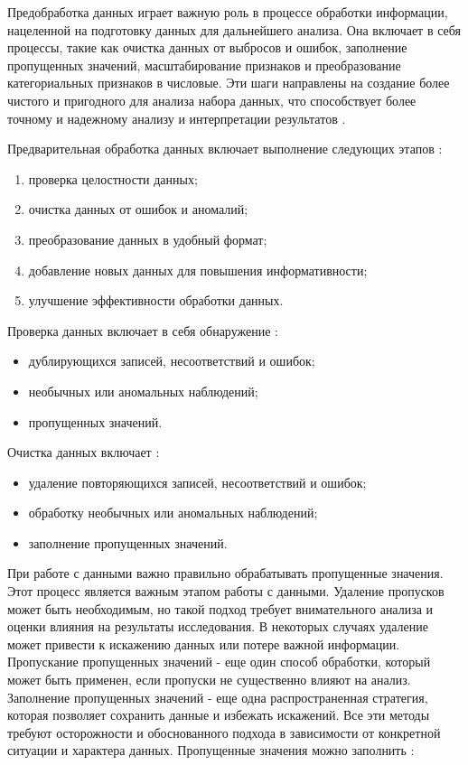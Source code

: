 Предобработка данных играет важную роль в процессе обработки информации, нацеленной на подготовку данных для дальнейшего анализа. Она включает в себя процессы, такие как очистка данных от выбросов и ошибок, заполнение пропущенных значений, масштабирование признаков и преобразование категориальных признаков в числовые. Эти шаги направлены на создание более чистого и пригодного для анализа набора данных, что способствует более точному и надежному анализу и интерпретации результатов .

Предварительная обработка данных включает выполнение следующих этапов :

\begin{enumerate}
	\item проверка целостности данных;
	\item очистка данных от ошибок и аномалий;
	\item преобразование данных в удобный формат;
	\item добавление новых данных для повышения информативности;
	\item улучшение эффективности обработки данных.
\end{enumerate}

Проверка данных включает в себя обнаружение :

\begin{itemize}
	\item дублирующихся записей, несоответствий и ошибок;
	\item необычных или аномальных наблюдений;
	\item пропущенных значений.
\end{itemize}

Очистка данных включает :

\begin{itemize}
	\item удаление повторяющихся записей, несоответствий и ошибок;
	\item обработку необычных или аномальных наблюдений;
	\item заполнение пропущенных значений.
\end{itemize}

При работе с данными важно правильно обрабатывать пропущенные значения. Этот процесс является важным этапом работы с данными. Удаление пропусков может быть необходимым, но такой подход требует внимательного анализа и оценки влияния на результаты исследования. В некоторых случаях удаление может привести к искажению данных или потере важной информации. Пропускание пропущенных значений - еще один способ обработки, который может быть применен, если пропуски не существенно влияют на анализ. Заполнение пропущенных значений - еще одна распространенная стратегия, которая позволяет сохранить данные и избежать искажений. Все эти методы требуют осторожности и обоснованного подхода в зависимости от конкретной ситуации и характера данных.
Пропущенные значения можно заполнить :

